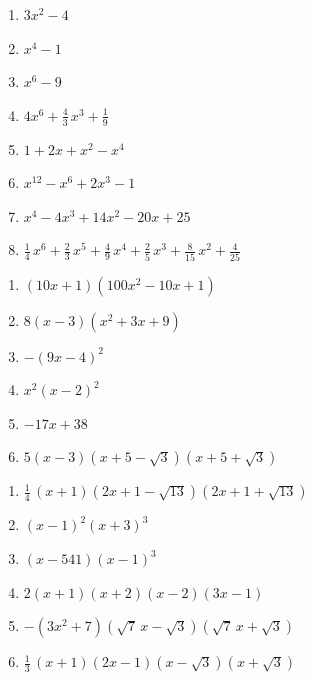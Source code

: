 \documentclass{ximera}
\begin{document}
\begin{oplossing} 
\begin{enumerate}
\item
\hyperlink{oef4.2}{$3x^2 - 4$}
\item
\hyperlink{oef4.2}{$x^4-1$}
\item
\hyperlink{oef4.2}{$x^6-9$}
\item
\hyperlink{oef4.2}{$4x^6 + \frac{4}{3}\,x^3+\frac{1}{9}$}
\item
\hyperlink{oef4.2}{$1 + 2x + x^2 - x^4$}
\item
\hyperlink{oef4.2}{$x^{12}-x^6+2x^3 - 1$}
\item
\hyperlink{oef4.2}{$x^4 - 4x^3 + 14x^2 - 20x + 25$}
\item
\hyperlink{oef4.2}{$\frac{1}{4}\,x^6 + \frac{2}{3}\,x^5 + \frac{4}{9}\,x^4 + \frac{2}{5}\,x^3 + \frac{8}{15}\,x^2 + \frac{4}{25}$}
\end{enumerate}
\end{oplossing} 

\begin{oplossing} 
\begin{enumerate}
\item
\hyperlink{oef4.3}{$(10x+1)(100x^2 - 10x + 1)$}
\item
\hyperlink{oef4.3}{$8(x-3)(x^2 + 3x + 9)$}
\item
\hyperlink{oef4.3}{$-(9x-4)^2$}
\item
\hyperlink{oef4.3}{$x^2(x-2)^2$}
\item
\hyperlink{oef4.3}{$-17x+38$}
\item
\hyperlink{oef4.3}{$5(x-3)(x+5-\sqrt{3})(x+5+\sqrt{3})$}
\end{enumerate}
\end{oplossing} 

\begin{oplossing} 
\begin{enumerate}
\item
\hyperlink{oef4.4}{$\frac{1}{4}\,(x+1)(2x+1-\sqrt{13})(2x+1+\sqrt{13})$}
\item
\hyperlink{oef4.4}{$(x-1)^2(x+3)^3$}
\item
\hyperlink{oef4.4}{$(x-541)(x-1)^3$}
\item
\hyperlink{oef4.4}{$2(x+1)(x+2)(x-2)(3x-1)$}
\item
\hyperlink{oef4.4}{$-(3x^2+7)(\sqrt{7}\,x-\sqrt{3})(\sqrt{7}\,x+\sqrt{3})$}
\item
\hyperlink{oef4.4}{$\frac{1}{3}\,(x+1)(2x-1)(x-\sqrt{3})(x+\sqrt{3})$}
\end{enumerate}
\end{oplossing} 
\end{document}
